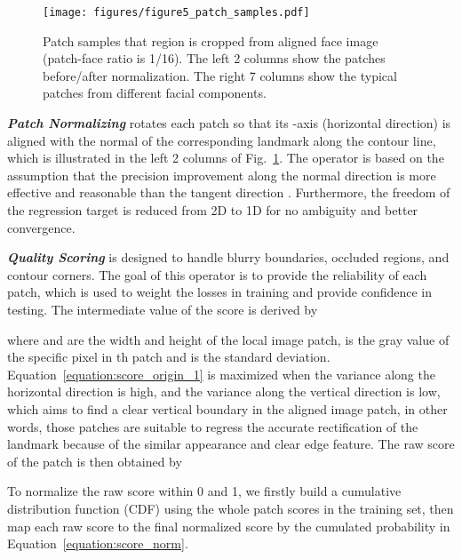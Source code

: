 \documentclass[letterpaper]{article} \usepackage{aaai23}  \usepackage{times}  \usepackage{helvet}  \usepackage{courier}  \usepackage[hyphens]{url}  \usepackage{graphicx} \urlstyle{rm} \def\UrlFont{\rm}  \usepackage{natbib}  \usepackage{caption} \frenchspacing  \setlength{\pdfpagewidth}{8.5in}  \setlength{\pdfpageheight}{11in}  \usepackage{algorithm}
\begin{document}
\begin{figure}[h]
\begin{center}
\texttt{[image: figures/figure5\_patch\_samples.pdf]}
\end{center}
   \caption{Patch samples that  region is cropped from  aligned face image (patch-face ratio is 1/16). The left 2 columns show the patches before/after normalization. The right 7 columns show the typical patches from different facial components.
   }
\label{figure:patch_samples}
\end{figure}

\vspace{5pt}
\noindent\textbf{\emph{Patch Normalizing}}
rotates each patch so that its -axis (horizontal direction) is aligned with the normal of the corresponding landmark along the contour line, which is illustrated in the left 2 columns of Fig.~\ref{figure:patch_samples}. 
The operator is based on the assumption that the precision improvement along the normal direction is more effective and reasonable than the tangent direction \cite{huang2021adnet}.
Furthermore, the freedom of the regression target is reduced from 2D to 1D for no ambiguity and better convergence.

\vspace{5pt}
\noindent\textbf{\emph{Quality Scoring}}
is designed to handle blurry boundaries, occluded regions, and contour corners.
The goal of this operator is to provide the reliability of each patch, which is used to weight the losses in training and provide confidence in testing. The intermediate value  of the score is derived by


\vspace{-5pt}

\vspace{-5pt}

where  and  are the width and height of the local image patch,  is the gray value of the specific pixel in th patch and  is the standard deviation.
Equation~\ref{equation:score_origin_1} is maximized when the variance along the horizontal direction is high, and the variance along the vertical direction is low, which aims to find a clear vertical boundary in the aligned image patch, in other words, those patches are suitable to regress the accurate rectification of the landmark because of the similar appearance and clear edge feature.
The raw score  of the patch is then obtained by


To normalize the raw score within 0 and 1, we firstly build a cumulative distribution function (CDF) using the whole patch scores in the training set, then map each raw score to the final normalized score  by the cumulated probability in Equation~\ref{equation:score_norm}. 
\end{document}

